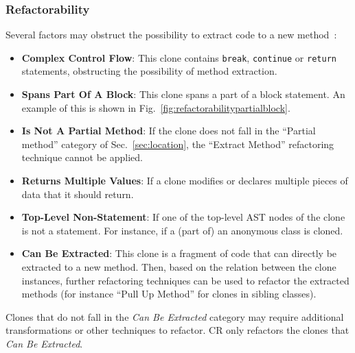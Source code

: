 \documentclass[sigconf,review,anonymous]{acmart}
\begin{document}
\subsubsection{Refactorability} \label{sec:refactorability}
Several factors may obstruct the possibility to extract code to a new method~\cite{tsantalis2015assessing}:
\begin{itemize}
    \item \textbf{Complex Control Flow}: This clone contains \texttt{break}, \texttt{continue} or \texttt{return} statements, obstructing the possibility of method extraction.
    \item \textbf{Spans Part Of A Block}: This clone spans a part of a block statement. An example of this is shown in Fig.~\ref{fig:refactorabilitypartialblock}.
    \item \textbf{Is Not A Partial Method}: If the clone does not fall in the ``Partial method'' category of Sec.~\ref{sec:location}, the ``Extract Method'' refactoring technique cannot be applied.
    \item \textbf{Returns Multiple Values}: If a clone modifies or declares multiple pieces of data that it should return.
    \item \textbf{Top-Level Non-Statement}: If one of the top-level AST nodes of the clone is not a statement. For instance, if a (part of) an anonymous class is cloned.
    \item \textbf{Can Be Extracted}: This clone is a fragment of code that can directly be extracted to a new method. Then, based on the relation between the clone instances, further refactoring techniques can be used to refactor the extracted methods (for instance ``Pull Up Method'' for clones in sibling classes).
\end{itemize}
Clones that do not fall in the \textit{Can Be Extracted} category may require additional transformations or other techniques to refactor. CR only refactors the clones that \textit{Can Be Extracted}.
\end{document}
